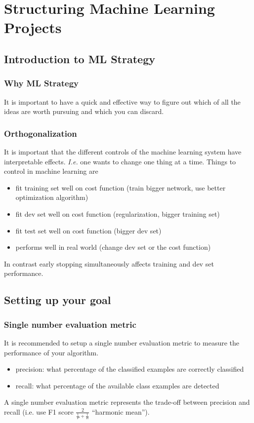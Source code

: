 \documentclass{article}
\begin{document}
\section{Structuring Machine Learning Projects}
\subsection{Introduction to ML Strategy}
\subsubsection{Why ML Strategy}
It is important to have a quick and effective way to figure out which of all the ideas are worth pursuing and which you can discard.

\subsubsection{Orthogonalization}
It is important that the different controls of the machine learning system have interpretable effects.
\emph{I.e.} one wants to change one thing at a time.
Things to control in machine learning are
\begin{itemize}
  \item fit training set well on cost function (train bigger network, use better optimization algorithm)
  \item fit dev set well on cost function (regularization, bigger training set)
  \item fit test set well on cost function (bigger dev set)
  \item performs well in real world (change dev set or the cost function)
\end{itemize}
In contrast early stopping simultaneously affects training and dev set performance.

\subsection{Setting up your goal}
\subsubsection{Single number evaluation metric}
It is recommended to setup a single number evaluation metric to measure the performance of your algorithm.
\begin{itemize}
  \item precision: what percentage of the classified examples are correctly classified
  \item recall: what percentage of the available class examples are detected
\end{itemize}
A single number evaluation metric represents the trade-off between precision and recall
(i.e. use F1 score $\frac{2}{\frac{1}{P}+\frac{1}{R}}$ ``harmonic mean'').
\end{document}
